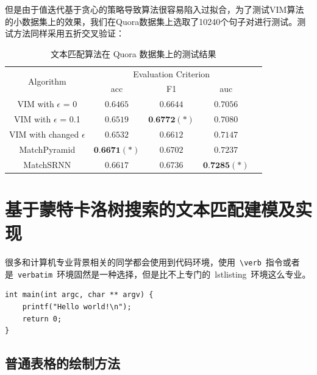 但是由于值迭代基于贪心的策略导致算法很容易陷入过拟合，为了测试VIM算法的小数据集上的效果，我们在Quora数据集上选取了10240个句子对进行测试。测试方法同样采用五折交叉验证：
\begin{table}[htbp]
\caption{文本匹配算法在 Quora 数据集上的测试结果}\label{tab:MDP_test}
\vspace{0.5em}\centering\wuhao
\begin{tabular}{ccccc}
\toprule[1.5pt]
	\multirow{2}{*}{Algorithm} &
        \multicolumn{3}{c}{\multirow{1}{*}{Evaluation Criterion}} \\
        \cline{2-4} & acc & F1 & auc \\
        \hline
        VIM with $\epsilon$ = 0 & $0.6465$ & $0.6644$ & $0.7056$ \\
        VIM with $\epsilon$ = 0.1 & $0.6519$ & $\textbf{0.6772}(*)$ & $0.7080$ \\
        VIM with changed $\epsilon$ & $0.6532$ & $0.6612$ & $0.7147$ \\
        \hline
        MatchPyramid & $\textbf{0.6671}(*)$ & $0.6702$ & $0.7237$ \\
        \hline
        MatchSRNN & $0.6617$ & $0.6736$ & $\textbf{0.7285}(*)$\\
        \bottomrule[1.5pt]
\end{tabular}
\vspace{\baselineskip}
\end{table}

\chapter{基于蒙特卡洛树搜索的文本匹配建模及实现}

很多和计算机专业背景相关的同学都会使用到代码环境，使用~\verb|\verb|~指令或者是~\verb|verbatim|~环境固然是一种选择，但是比不上专门的~lstlisting~环境这么专业。

\begin{lstlisting}
int main(int argc, char ** argv) {
    printf("Hello world!\n");
    return 0;
}
\end{lstlisting}

\section{普通表格的绘制方法}

